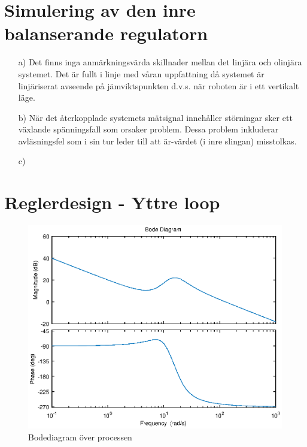 \documentclass[11pt]{article}
\begin{document}
\section{Simulering av den inre balanserande regulatorn}\vspace*{1em}
\begin{enumerate}
\item[a)] Det finns inga anmärkningsvärda skillnader mellan det linjära och olinjära systemet. Det är fullt i linje med våran uppfattning då systemet är linjäriserat avseende på jämviktspunkten d.v.s. när roboten är i ett vertikalt läge.
\item[b)] När det återkopplade systemets mätsignal innehåller störningar sker ett växlande spänningsfall som orsaker problem. Dessa problem inkluderar avläsningsfel som i sin tur leder till att är-värdet (i inre slingan) misstolkas.
\item[c)] 
\end{enumerate}
\newpage
\section{Reglerdesign - Yttre loop}
\begin{figure}[h!]
\centering
\includegraphics[scale=1]{Figures/bodeplot}
\caption{Bodediagram över processen}
\end{figure}
\end{document}
